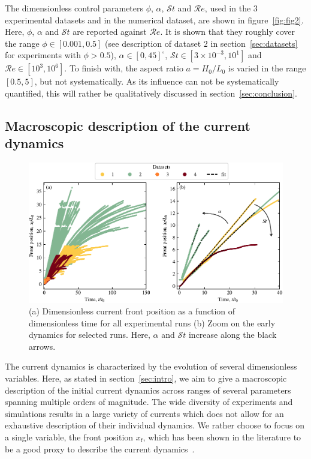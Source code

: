 \documentclass[12pt]{article}
\begin{document}
The dimensionless control parameters $\phi$, $\alpha$, $\mathcal{S}t$ and $\mathcal{R}e$, used in the 3 experimental datasets and in the numerical dataset, are shown in figure~\ref{fig:fig2}. Here, $\phi$, $\alpha$ and $\mathcal{S}t$ are reported against $\mathcal{R}e$. It is shown that they roughly cover the range $\phi \in [0.001, 0.5]$ (see description of dataset 2 in section~\ref{sec:datasets} for experiments with $\phi > 0.5$), $\alpha \in [0,45]^\circ$, $\mathcal{S}t \in [3{\times}10^{-3}, 10^{1}]$ and $\mathcal{R}e \in [10^3, 10^6]$. To finish with, the aspect ratio $a=H_0/L_0$ is varied in the range $[0.5, 5]$, but not systematically. As its influence can not be systematically quantified, this will rather be qualitatively discussed in section~\ref{sec:conclusion}.

\subsection{Macroscopic description of the current dynamics}

\begin{figure}[ht]
	\centering
	\includegraphics{figure3.pdf}
	\caption{(a) Dimensionless current front position as a function of dimensionless time for all experimental runs (b) Zoom on the early dynamics for selected runs. Here, $\alpha$ and $\mathcal{S}t$ increase along the black arrows.}
	\label{fig:fig3}
\end{figure}

The current dynamics is characterized by the evolution of several dimensionless variables. Here, as stated in section~\ref{sec:intro}, we aim to give a macroscopic description of the initial current dynamics across ranges of several parameters spanning multiple orders of magnitude. The wide diversity of experiments and simulations results in a large variety of currents which does not allow for an exhaustive description of their individual dynamics. We rather choose to focus on a single variable, the front position $x_{\text{f}}$, which has been shown in the literature to be a good proxy to describe the current dynamics~\citep[e.g.][]{bonnecaze1993particle, Chowdhury2011, Adduce2012}.
\end{document}
